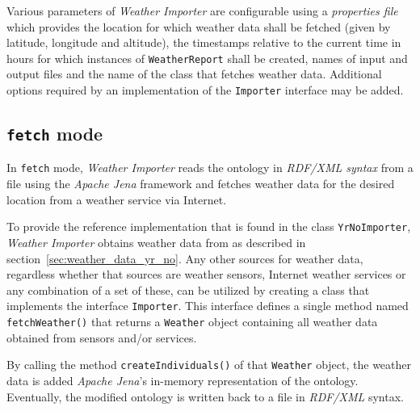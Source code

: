Various parameters of \emph{Weather Importer} are configurable using a \emph{properties file}~\cite{java_properties} which provides the location for which weather data shall be fetched (given by latitude, longitude and altitude), the timestamps relative to the current time in hours for which instances of \texttt{WeatherReport} shall be created, names of input and output files and the name of the class that fetches weather data. Additional options required by an implementation of the \texttt{Importer} interface may be added.

\subsection{\texttt{fetch} mode}
\label{subsec:importer_fetch}

In \texttt{fetch} mode, \emph{Weather Importer} reads the \thinkhomeweather ontology in \emph{RDF/XML syntax} from a file using the \emph{Apache Jena} framework and fetches weather data for the desired location from a weather service via Internet.

To provide the reference implementation that is found in the class \texttt{YrNoImporter}, \emph{Weather Importer} obtains weather data from \yrno as described in section~\ref{sec:weather_data_yr_no}. Any other sources for weather data, regardless whether that sources are weather sensors, Internet weather services or any combination of a set of these, can be utilized by creating a class that implements the interface \texttt{Importer}. This interface defines a single method named \texttt{fetchWeather()} that returns a \texttt{Weather} object containing all weather data obtained from sensors and/or services.

By calling the method \texttt{createIndividuals()} of that \texttt{Weather} object, the weather data is added \emph{Apache Jena}'s in-memory representation of the ontology. Eventually, the modified ontology is written back to a file in \emph{RDF/XML} syntax.

